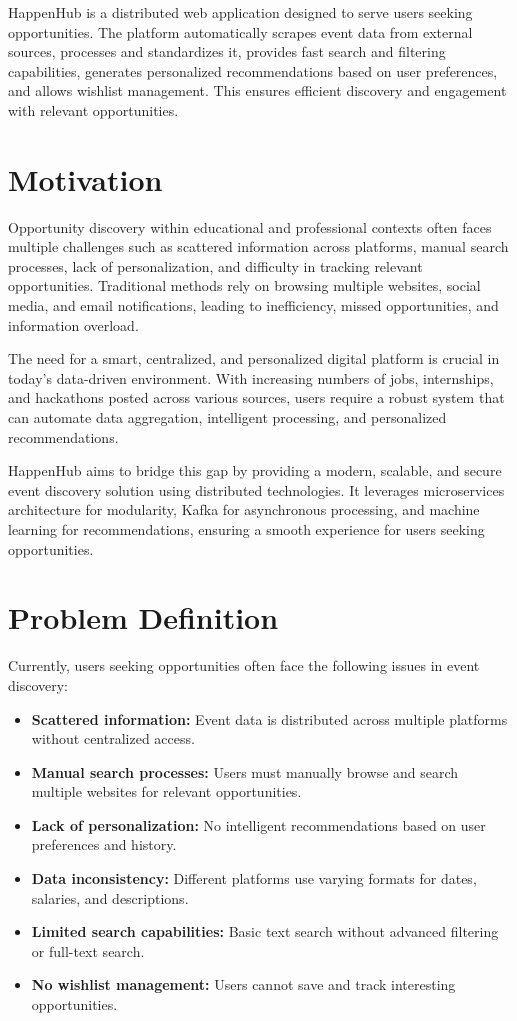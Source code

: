 \documentclass[12pt,a4paper]{report}
\begin{document}
HappenHub is a distributed web application designed to serve users seeking
opportunities. The platform automatically scrapes event data from external
sources, processes and standardizes it, provides fast search and filtering
capabilities, generates personalized recommendations based on user preferences,
and allows wishlist management. This ensures efficient discovery and engagement
with relevant opportunities.

\section{Motivation}
Opportunity discovery within educational and professional contexts often faces
multiple challenges such as scattered information across platforms, manual
search processes, lack of personalization, and difficulty in tracking relevant
opportunities. Traditional methods rely on browsing multiple websites, social
media, and email notifications, leading to inefficiency, missed opportunities,
and information overload.

The need for a smart, centralized, and personalized digital platform is crucial
in today's data-driven environment. With increasing numbers of jobs,
internships, and hackathons posted across various sources, users require a
robust system that can automate data aggregation, intelligent processing, and
personalized recommendations.

HappenHub aims to bridge this gap by providing a modern, scalable, and secure
event discovery solution using distributed technologies. It leverages
microservices architecture for modularity, Kafka for asynchronous processing,
and machine learning for recommendations, ensuring a smooth experience for
users seeking opportunities.

\section{Problem Definition}
Currently, users seeking opportunities often face the following issues in event
discovery:
\begin{itemize}
    \item \textbf{Scattered information:} Event data is distributed across multiple platforms without centralized access.
    \item \textbf{Manual search processes:} Users must manually browse and search multiple websites for relevant opportunities.
    \item \textbf{Lack of personalization:} No intelligent recommendations based on user preferences and history.
    \item \textbf{Data inconsistency:} Different platforms use varying formats for dates, salaries, and descriptions.
    \item \textbf{Limited search capabilities:} Basic text search without advanced filtering or full-text search.
    \item \textbf{No wishlist management:} Users cannot save and track interesting opportunities.
\end{itemize}
\end{document}
